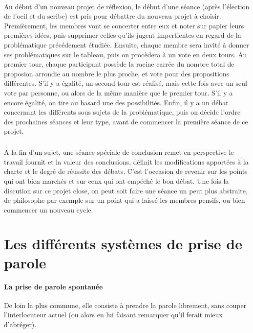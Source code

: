 \documentclass[a4paper,12pt]{article}
\begin{document}
\paragraph{}
Au début d'un nouveau projet de réflexion, le début d'une séance (après l'élection de l'oeil et du scribe) est pris pour débattre du nouveau projet à choisir. Premièrement, les membres vont se concerter entre eux et noter sur papier leurs premières idées, puis supprimer celles qu'ils jugent impertientes en regard de la problématique précédement étudiée. Ensuite, chaque membre sera invité à donner ses problématiques sur le tableau, puis on procèdera à un vote en deux tours.
Au premier tour, chaque participant possède la racine carrée du nombre total de proposion arrondie au nombre le plus proche, et vote pour des propositions différentes. S'il y a égalité, un second tour est réalisé, mais cette fois avec un seul vote par personne, ou alors de la même manière que le premier tour. S'il y a encore égalité, on tire au hasard une des possibilités. 
Enfin, il y a un débat concernant les différents sous sujets de la problématique, puis on décide l'ordre des prochaines séances et leur type, avant de commencer la première séance de ce projet.
\subparagraph{}
A la fin d'un sujet, une séance spéciale de conclusion remet en perspective le travail fournit et la valeur des conclusions, définit les modifications apportées à la charte et le degré de réussite des débats. C'est l'occasion de revenir sur les points qui ont bien marchés et sur ceux qui ont empéché le bon débat. Une fois la discution sur ce projet close, on peut soit faire une séance un peut plus abstraite, de philosophe par exemple sur un point qui a laissé les membres pensifs, ou bien commencer un nouveau cycle.

\section{Les différents systèmes de prise de parole}
\paragraph{La prise de parole spontanée}
De loin la plus commune, elle consiste à prendre la parole librement, sans couper l'interlocuteur actuel (ou alors en lui faisant remarquer qu'il ferait mieux d'abréger).
\end{document}
